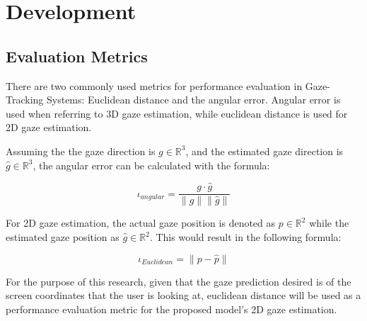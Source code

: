 \chapter{Development}
\label{Chap3}

\section{Evaluation Metrics}
There are two commonly used metrics for performance evaluation in Gaze-Tracking Systems:
Euclidean distance and the angular error. Angular error is used when referring to 3D gaze estimation, while euclidean distance is used for 2D gaze estimation.

Assuming the the gaze direction is \boldmath $g \in \mathbb{R}^3$, and the estimated gaze direction is
\boldmath $\hat{g}  \in \mathbb{R}^3$, the angular error can be calculated with the formula:

\begin{equation} \iota _{angular} = \frac{g \cdot  \hat{g} }{ \|g\|\|\hat{g}\| } \end{equation}

For 2D gaze estimation, the actual gaze position is denoted as 
\boldmath $p \in \mathbb{R}^2$ while the estimated gaze position as
\boldmath $\hat{g} \in \mathbb{R}^2$. This would result in the following formula:

\begin{equation} \iota _{Euclidean} = \| p - \hat{p} \|  \end{equation}

For the purpose of this research, given that the gaze prediction desired is of the screen coordinates that the user is looking at, euclidean distance will be used
as a performance evaluation metric for the proposed model's 2D gaze estimation.
